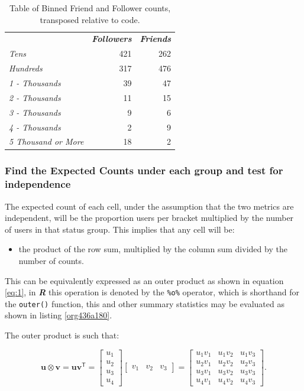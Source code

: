 \documentclass[11pt]{article}
\begin{document}
\begin{table}[htbp]
\caption{\label{tab:org6a18bae}Table of Binned Friend and Follower counts, transposed relative to code.}
\centering
\begin{tabular}{lrr}
 & \textbf{\textbf{\emph{Followers}}} & \textbf{\textbf{\emph{Friends}}}\\
\emph{Tens} & 421 & 262\\
\emph{Hundreds} & 317 & 476\\
\emph{1 - Thousands} & 39 & 47\\
\emph{2 - Thousands} & 11 & 15\\
\emph{3 - Thousands} & 9 & 6\\
\emph{4 - Thousands} & 2 & 9\\
\emph{5 Thousand or More} & 18 & 2\\
\end{tabular}
\end{table}

\subsubsection{Find the Expected Counts under each group and test for independence}
\label{sec:org8c54e11}
The expected count of each cell, under the assumption that the two metrics are
independent, will be the proportion users per bracket multiplied by the number
of users in that status group. This implies that any cell will be:

\begin{itemize}
\item the product of the row sum, multiplied by the column sum divided by the number of counts.
\end{itemize}

This can be equivalently expressed as an outer product as shown in equation
\eqref{eq:1}, in \textbf{\emph{R}} this operation is denoted by the \texttt{\%o\%} operator, which is
shorthand for the \texttt{outer()} function, this and other summary statistics may be
evaluated as shown in listing \ref{org436a180}.

The outer product is such that:


$$
\mathbf{u} \otimes \mathbf {v} =\mathbf {u} \mathbf {v} ^{\textsf {T}}={\begin{bmatrix}u_{1}\\u_{2}\\u_{3}\\u_{4}\end{bmatrix}}{\begin{bmatrix}v_{1}&v_{2}&v_{3}\end{bmatrix}}={\begin{bmatrix}u_{1}v_{1}&u_{1}v_{2}&u_{1}v_{3}\\u_{2}v_{1}&u_{2}v_{2}&u_{2}v_{3}\\u_{3}v_{1}&u_{3}v_{2}&u_{3}v_{3}\\u_{4}v_{1}&u_{4}v_{2}&u_{4}v_{3}\end{bmatrix}}.
$$
\end{document}
